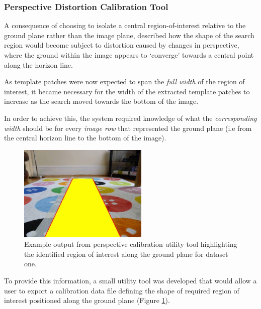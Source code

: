 \subsubsection{Perspective Distortion Calibration Tool}

A consequence of choosing to isolate a central region-of-interest relative to the ground plane rather than the image plane, described how the shape of the search region would become subject to distortion caused by changes in perspective, where the ground within the image appears to `converge' towards a central point along the horizon line.

As template patches were now expected to span the \textit{full width} of the region of interest, it became necessary for the width of the extracted template patches to increase as the search moved towards the bottom of the image. 

In order to achieve this, the system required knowledge of what the \textit{corresponding width} should be for every \textit{image row} that represented the ground plane (i.e from the central horizon line to the bottom of the image). 

\begin{figure}
\vspace{-20pt}
  \begin{center}
    \includegraphics[width=0.55\textwidth]{images/calib.jpg}
  \end{center}
  \vspace{-10pt}
  \caption{Example output from perspective calibration utility tool highlighting the identified region of interest along the ground plane for dataset one.}
     \label{fig:calib}
  \vspace{-10pt}
\end{figure}

To provide this information, a small utility tool was developed that would allow a user to export a calibration data file defining the shape of required region of interest positioned along the ground plane (Figure \ref{fig:calib}). 

